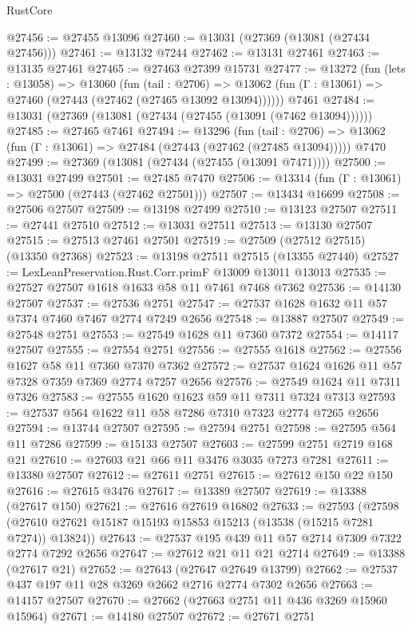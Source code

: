 \begin{lexlean}{RustCore}
\begin{coremodule}
@27456 := @27455 @13096
@27460 := @13031 (@27369 (@13081 (@27434 @27456)))
@27461 := @13132 @7244
@27462 := @13131 @27461
@27463 := @13135 @27461
@27465 := @27463 @27399 @15731
@27477 := @13272
    (fun (lets : @13058) =>
    @13060
      (fun (tail : @2706) =>
      @13062 (fun (Γ : @13061) => @27460 (@27443 (@27462 (@27465 @13092 @13094))))))
    @7461
@27484 := @13031 (@27369 (@13081 (@27434 (@27455 (@13091 (@7462 @13094))))))
@27485 := @27465 @7461
@27494 := @13296
    (fun (tail : @2706) => @13062 (fun (Γ : @13061) => @27484 (@27443 (@27462 (@27485 @13094)))))
    @7470
@27499 := @27369 (@13081 (@27434 (@27455 (@13091 @7471))))
@27500 := @13031 @27499
@27501 := @27485 @7470
@27506 := @13314 (fun (Γ : @13061) => @27500 (@27443 (@27462 @27501)))
@27507 := @13434 @16699
@27508 := @27506 @27507
@27509 := @13198 @27499
@27510 := @13123 @27507
@27511 := @27441 @27510
@27512 := @13031 @27511
@27513 := @13130 @27507
@27515 := @27513 @27461 @27501
@27519 := @27509 (@27512 @27515) (@13350 @27368)
@27523 := @13198 @27511 @27515 (@13355 @27440)
@27527 := LexLeanPreservation.Rust.Corr.primF @13009 @13011 @13013
@27535 := @27527 @27507 @1618 @1633 @58 @11 @7461 @7468 @7362
@27536 := @14130 @27507
@27537 := @27536 @2751
@27547 := @27537 @1628 @1632 @11 @57 @7374 @7460 @7467 @2774 @7249 @2656
@27548 := @13887 @27507
@27549 := @27548 @2751
@27553 := @27549 @1628 @11 @7360 @7372
@27554 := @14117 @27507
@27555 := @27554 @2751
@27556 := @27555 @1618
@27562 := @27556 @1627 @58 @11 @7360 @7370 @7362
@27572 := @27537 @1624 @1626 @11 @57 @7328 @7359 @7369 @2774 @7257 @2656
@27576 := @27549 @1624 @11 @7311 @7326
@27583 := @27555 @1620 @1623 @59 @11 @7311 @7324 @7313
@27593 := @27537 @564 @1622 @11 @58 @7286 @7310 @7323 @2774 @7265 @2656
@27594 := @13744 @27507
@27595 := @27594 @2751
@27598 := @27595 @564 @11 @7286
@27599 := @15133 @27507
@27603 := @27599 @2751 @2719 @168 @21
@27610 := @27603 @21 @66 @11 @3476 @3035 @7273 @7281
@27611 := @13380 @27507
@27612 := @27611 @2751
@27615 := @27612 @150 @22 @150
@27616 := @27615 @3476
@27617 := @13389 @27507
@27619 := @13388 (@27617 @150)
@27621 := @27616 @27619 @16802
@27633 := @27593
    (@27598 (@27610 @27621 @15187 @15193 @15853 @15213 (@13538 (@15215 @7281 @7274)) @13824))
@27643 := @27537 @195 @439 @11 @57 @2714 @7309 @7322 @2774 @7292 @2656
@27647 := @27612 @21 @11 @21 @2714
@27649 := @13388 (@27617 @21)
@27652 := @27643 (@27647 @27649 @13799)
@27662 := @27537 @437 @197 @11 @28 @3269 @2662 @2716 @2774 @7302 @2656
@27663 := @14157 @27507
@27670 := @27662 (@27663 @2751 @11 @436 @3269 @15960 @15964)
@27671 := @14180 @27507
@27672 := @27671 @2751

\end{coremodule}
\end{lexlean}
